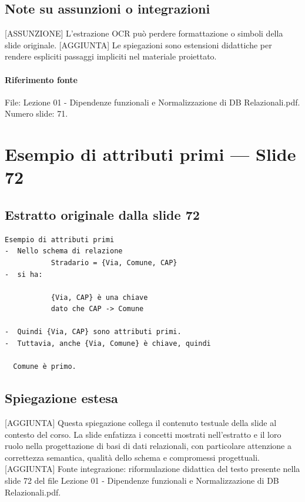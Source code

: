 \documentclass[11pt]{article}
\begin{document}
\subsection*{Note su assunzioni o integrazioni}
[ASSUNZIONE] L'estrazione OCR può perdere formattazione o simboli della slide originale.
[AGGIUNTA] Le spiegazioni sono estensioni didattiche per rendere espliciti passaggi impliciti nel materiale proiettato.
\paragraph{Riferimento fonte} File: Lezione 01 - Dipendenze funzionali e Normalizzazione di DB Relazionali.pdf. Numero slide: 71.
\section{Esempio di attributi primi --- Slide 72}
\subsection*{Estratto originale dalla slide 72}
\begin{lstlisting}
Esempio di attributi primi
-  Nello schema di relazione
           Stradario = {Via, Comune, CAP}
-  si ha:

           {Via, CAP} è una chiave
           dato che CAP -> Comune

-  Quindi {Via, CAP} sono attributi primi.
-  Tuttavia, anche {Via, Comune} è chiave, quindi

  Comune è primo.
\end{lstlisting}
\subsection*{Spiegazione estesa}
[AGGIUNTA] Questa spiegazione collega il contenuto testuale della slide al contesto del corso. La slide enfatizza i concetti mostrati nell'estratto e il loro ruolo nella progettazione di basi di dati relazionali, con particolare attenzione a correttezza semantica, qualità dello schema e compromessi progettuali.
[AGGIUNTA] Fonte integrazione: riformulazione didattica del testo presente nella slide 72 del file Lezione 01 - Dipendenze funzionali e Normalizzazione di DB Relazionali.pdf.
\end{document}
